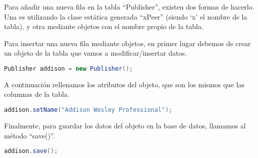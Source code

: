 Para añadir una nueva fila en la tabla “Publisher”, existen dos formas de hacerlo. Una es utilizando la clase estática generada “xPeer” (siendo ‘x’ el nombre de la tabla), y otra mediante objetos con el nombre propio de la tabla.

Para insertar una nueva fila mediante objetos, en primer lugar debemos de crear un objeto de la tabla que vamos a modificar/insertar datos.

\begin{lstlisting}[language=Java]
Publisher addison = new Publisher();
\end{lstlisting}

A continuación rellenamos los atributos del objeto, que son los mismos que las columnas de la tabla.

\begin{lstlisting}[language=Java]
addison.setName("Addison Wesley Professional");
\end{lstlisting}

Finalmente, para guardar los datos del objeto en la base de datos, llamamos al método “save()”.

\begin{lstlisting}[language=Java]
addison.save();
\end{lstlisting}
